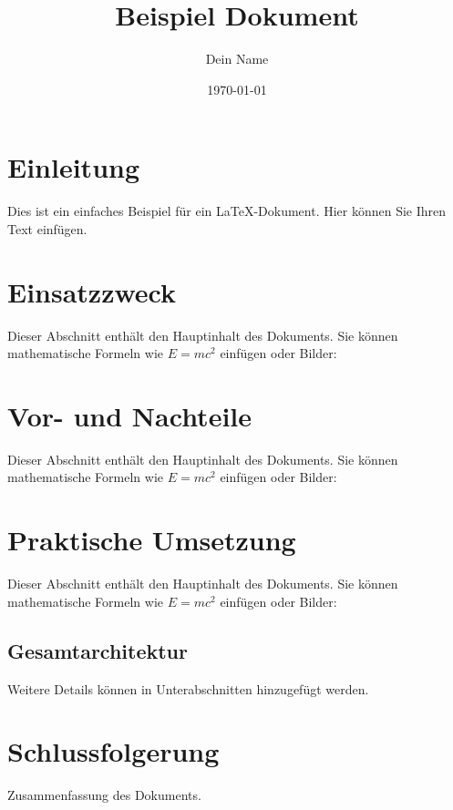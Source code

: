 \documentclass{article}
\title{Beispiel Dokument}
\author{Dein Name}
\date{\today}
\begin{document}
\maketitle %

\section{Einleitung}
Dies ist ein einfaches Beispiel für ein LaTeX-Dokument.
Hier können Sie Ihren Text einfügen.

\section{Einsatzzweck}
Dieser Abschnitt enthält den Hauptinhalt des Dokuments.
Sie können mathematische Formeln wie $E=mc^2$ einfügen oder Bilder:

\section{Vor- und Nachteile}
Dieser Abschnitt enthält den Hauptinhalt des Dokuments.
Sie können mathematische Formeln wie $E=mc^2$ einfügen oder Bilder:

\section{Praktische Umsetzung}
Dieser Abschnitt enthält den Hauptinhalt des Dokuments.
Sie können mathematische Formeln wie $E=mc^2$ einfügen oder Bilder:

\subsection{Gesamtarchitektur}
Weitere Details können in Unterabschnitten hinzugefügt werden.

\section{Schlussfolgerung}
Zusammenfassung des Dokuments.
\end{document}
